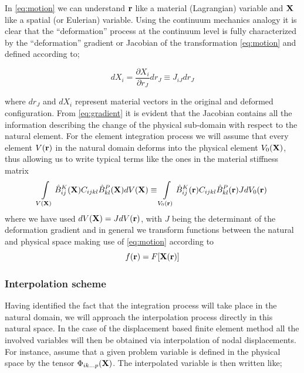 In \cref{eq:motion} we can understand $\vb{r}$ like a material (Lagrangian) variable and $\vb{X}$ like a spatial (or Eulerian) variable. Using the continuum mechanics analogy it is clear that the ``deformation'' process at the continuum level is fully characterized by the ``deformation'' gradient or Jacobian of the transformation \cref{eq:motion} and defined according to;

\begin{equation}
dX_i=\dfrac{\partial X_i}{\partial r_J}dr_J\equiv J_{iJ}dr_{J}
\label{eq:gradient}
\end{equation}

where $dr_{J}$ and $dX_i$ represent material vectors in the original and deformed configuration. From \cref{eq:gradient} it is evident that the Jacobian contains all the information describing the change of the physical sub-domain with respect to the natural element. For the element integration process we will assume that every element $V(\vb{r})$ in the natural domain deforms into the physical element $V_0(\vb{X})$, thus allowing us to write typical terms like the ones in the material stiffness matrix
\begin{equation}
\int\limits_{V(\vb{X})} \hat{B}_{ij}^K(\vb{X}) C_{ijkl} \hat{B}_{kl}^P(\vb{X}) dV(\vb{X})\equiv \int\limits_{V_0(\vb{r})} \hat{B}_{ij}^K(\vb{r}) C_{ijkl} \hat{B}_{kl}^P(\vb{r})J dV_0(\vb{r})
\label{eq:matmatrix}
\end{equation}
where we have used $dV(\vb{X})=JdV(\vb{r})$, with $J$ being the determinant of the deformation gradient and in general we transform functions between the natural and physical space making use of \cref{eq:motion} according to
\begin{equation}
f(\vb{r})=F[\vb{X}(\vb{r})]
\label{eq:funtrans}
\end{equation}


\subsubsection*{Interpolation scheme}
Having identified the fact that the integration process will take place in the natural domain, we will approach the interpolation process directly in this natural space. In the case of the displacement based finite element method all the involved variables will then be obtained via interpolation of nodal displacements. For instance, assume that a given problem variable is defined in the physical space by the tensor $\Phi_{ik...p}(\vb{X})$. The interpolated variable is then written like;

